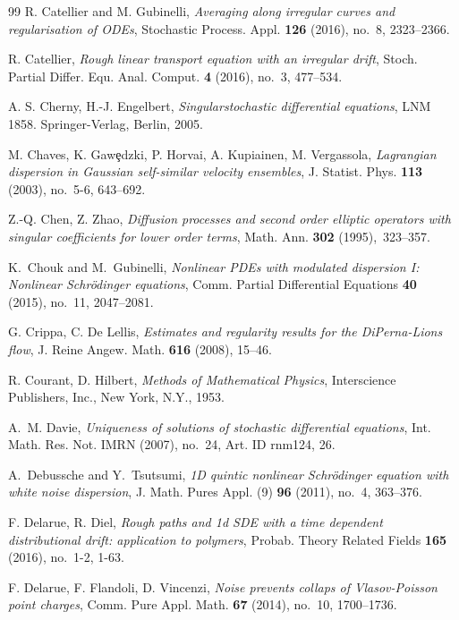\documentclass[a4paper,10pt]{article}
\newcommand\1{\mathbbm{1}}
\numberwithin{equation}{section}
\begin{document}
\begin{thebibliography}{99}
R. Catellier and M. Gubinelli, \textit{Averaging along irregular curves and regularisation of ODEs}, Stochastic Process. Appl.  \textbf{{\bf126}} (2016), no.~8, 2323--2366.

R. Catellier, \textit{Rough linear transport equation with an irregular drift}, Stoch. Partial Differ. Equ. Anal. Comput. \textbf{4} (2016), no.~3, 477--534. 

A. S. Cherny, H.-J. Engelbert, \textit{Singularstochastic differential equations}, LNM 1858. Springer-Verlag, Berlin, 2005.

M. Chaves, K. Gaw{\c{e}}dzki, P. Horvai, A. Kupiainen, M. Vergassola,
\textit{Lagrangian dispersion in Gaussian self-similar velocity ensembles}, J.
Statist. Phys. \textbf{113} (2003), no.~5-6, 643--692.

Z.-Q. Chen, Z. Zhao, \textit{Diffusion processes and second order
elliptic operators with singular coefficients for lower order terms},
Math. Ann. \textbf{302} (1995),\ 323--357.

K.~Chouk and M.~Gubinelli, \textit{Nonlinear {PDE}s with modulated dispersion {I}: {N}onlinear {S}chr\"odinger equations}, Comm. Partial Differential Equations {\bf 40} (2015), no.~11, 2047--2081.

G. Crippa, C. De Lellis, \textit{Estimates and regularity results for the
DiPerna-Lions flow}, J. Reine Angew. Math. \textbf{616} (2008), 15--46.

R. Courant, D. Hilbert, \textit{Methods of Mathematical Physics}, Interscience
Publishers, Inc., New York, N.Y., 1953.

A.~M. Davie, \textit{Uniqueness of solutions of stochastic differential
  equations}, Int. Math. Res. Not. IMRN (2007), no.~24, Art. ID rnm124, 26.

A.~Debussche and Y.~Tsutsumi, \textit{1{D} quintic nonlinear {S}chr\"odinger
  equation with white noise dispersion}, J. Math. Pures Appl. (9) {\bf
  96} (2011), no.~4, 363--376.
  
F. Delarue, R. Diel, \textit{Rough paths and 1d SDE with a time dependent distributional drift: application to polymers}, Probab. Theory Related Fields \textbf{165} (2016), no.~1-2, 1-63. 

F. Delarue, F. Flandoli, D. Vincenzi, \textit{Noise prevents collaps of Vlasov-Poisson point charges}, Comm. Pure Appl. Math. {\bf 67} (2014), no.~10, 1700--1736.


\end{thebibliography}
\end{document}
